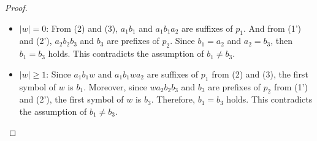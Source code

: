 \begin{proof}
\begin{itemize}
\item $|w|=0$: From (2) and (3), $a_{1}b_{1}$ and $a_{1}b_{1}a_{2}$ are suffixes of $p_{1}$. And from (1') and (2'), $a_{2}b_{2}b_{3}$ and $b_{3}$ are prefixes of $p_{2}$.
Since $b_{1}=a_{2}$ and $a_{2}=b_{3}$, then $b_{1}=b_{3}$ holds.
This contradicts the assumption of $b_{1}\not= b_{3}$.
%
\item $|w| \ge 1$: Since $a_{1}b_{1}w$ and $a_{1}b_{1}wa_{2}$ are suffixes of $p_{1}$ from (2) and (3), the first symbol of $w$ is $b_{1}$.
Moreover, since $wa_{2}b_{2}b_{3}$ and $b_{3}$ are prefixes of $p_{2}$ from (1') and (2'),
the first symbol of $w$ is $b_{3}$.
Therefore, $b_{1}=b_{3}$ holds.
This contradicts the assumption of $b_{1} \ne b_{3}$.
\end{itemize}
\end{proof}
